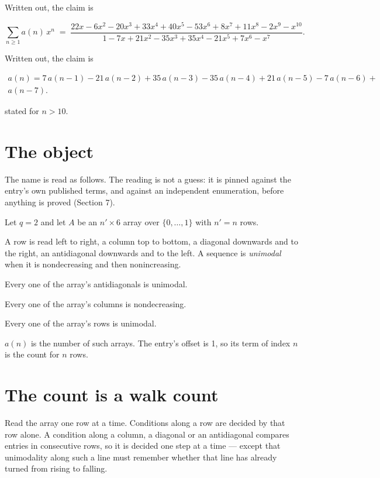 \documentclass[11pt]{article}
\theoremstyle{definition}
\begin{document}
Written out, the claim is

\[\sum_{n \ge 1} a(n)\,x^n \;=\; \frac{22x - 6x^{2} - 20x^{3} + 33x^{4} + 40x^{5} - 53x^{6} + 8x^{7} + 11x^{8} - 2x^{9} - x^{10}}{1 - 7x + 21x^{2} - 35x^{3} + 35x^{4} - 21x^{5} + 7x^{6} - x^{7}}.\]

Written out, the claim is

\begin{multline*} a(n) = 7\,a(n-1) - 21\,a(n-2) + 35\,a(n-3) - 35\,a(n-4) + 21\,a(n-5) - 7\,a(n-6) + \\ a(n-7). \end{multline*}

stated for $n > 10$.

\section{The object}

The name is read as follows. The reading is not a guess: it is pinned against the entry's own published terms, and against an independent enumeration, before anything is proved (Section 7).

Let $q = 2$ and let $A$ be an $n' \times 6$ array over $\{0,\dots,1\}$ with $n' = n$ rows.

A row is read left to right, a column top to bottom, a diagonal downwards and to the right, an antidiagonal downwards and to the left. A sequence is {\itshape unimodal} when it is nondecreasing and then nonincreasing.

Every one of the array's antidiagonals is unimodal.

Every one of the array's columns is nondecreasing.

Every one of the array's rows is unimodal.

$a(n)$ is the number of such arrays. The entry's offset is 1, so its term of index $n$ is the count for $n$ rows.

\section{The count is a walk count}

Read the array one row at a time. Conditions along a row are decided by that row alone. A condition along a column, a diagonal or an antidiagonal compares entries in consecutive rows, so it is decided one step at a time --- except that unimodality along such a line must remember whether that line has already turned from rising to falling.
\end{document}
